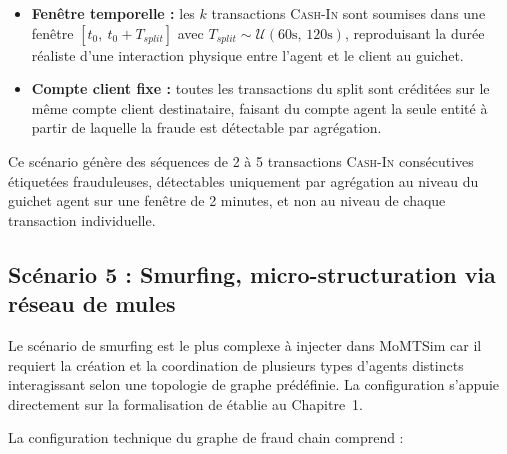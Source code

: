 \documentclass[11pt,a4paper,oneside]{report}
\theoremstyle{definition}
\theoremstyle{remark}
\begin{document}
\begin{itemize}
    \item \textbf{Fenêtre temporelle :} les $k$ transactions \textsc{Cash-In} sont soumises dans une fenêtre $[t_0,\ t_0 + T_{split}]$ avec $T_{split} \sim \mathcal{U}(60\text{s},\, 120\text{s})$, reproduisant la durée réaliste d'une interaction physique entre l'agent et le client au guichet.

    \item \textbf{Compte client fixe :} toutes les transactions du split sont créditées sur le même compte client destinataire, faisant du compte agent la seule entité à partir de laquelle la fraude est détectable par agrégation.
\end{itemize}

Ce scénario génère des séquences de 2 à 5 transactions \textsc{Cash-In} consécutives étiquetées frauduleuses, détectables uniquement par agrégation au niveau du guichet agent sur une fenêtre de 2 minutes, et non au niveau de chaque transaction individuelle.

\subsection{Scénario 5 : Smurfing, micro-structuration via réseau de mules}

Le scénario de smurfing est le plus complexe à injecter dans MoMTSim car il requiert la création et la coordination de plusieurs types d'agents distincts interagissant selon une topologie de graphe prédéfinie. La configuration s'appuie directement sur la formalisation de \citet{zhdanova2014smurfs} établie au Chapitre~1.

La configuration technique du graphe de fraud chain comprend :
\end{document}
